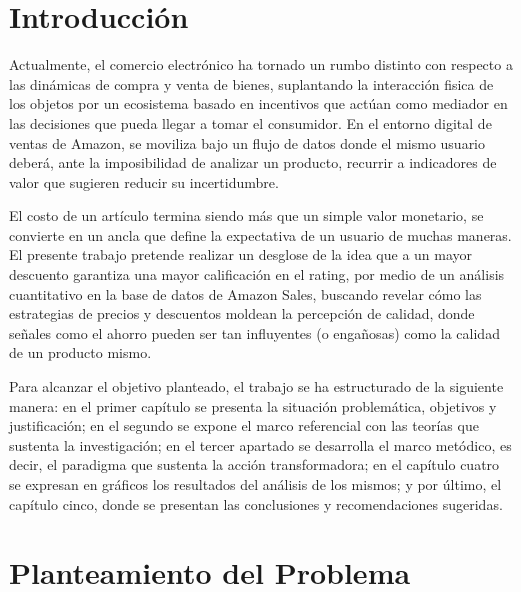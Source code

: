 \documentclass[oneside,11pt]{Latex/Classes/PhDthesisPSnPDF}
\begin{document}
  \cleardoublepage

\mainmatter
\def\baselinestretch{1.5}

\chapter*{Introducción}

Actualmente, el comercio electrónico ha tornado un rumbo distinto con
respecto a las dinámicas de compra y venta de bienes, suplantando la
interacción fisica de los objetos por un ecosistema basado en incentivos
que actúan como mediador en las decisiones que pueda llegar a tomar el
consumidor. En el entorno digital de ventas de Amazon, se moviliza bajo
un flujo de datos donde el mismo usuario deberá, ante la imposibilidad
de analizar un producto, recurrir a indicadores de valor que sugieren
reducir su incertidumbre.

El costo de un artículo termina siendo más que un simple valor
monetario, se convierte en un ancla que define la expectativa de un
usuario de muchas maneras. El presente trabajo pretende realizar un
desglose de la idea que a un mayor descuento garantiza una mayor
calificación en el rating, por medio de un análisis cuantitativo en la
base de datos de Amazon Sales, buscando revelar cómo las estrategias de
precios y descuentos moldean la percepción de calidad, donde señales
como el ahorro pueden ser tan influyentes (o engañosas) como la calidad
de un producto mismo.

Para alcanzar el objetivo planteado, el trabajo se ha estructurado de la
siguiente manera: en el primer capítulo se presenta la situación
problemática, objetivos y justificación; en el segundo se expone el
marco referencial con las teorías que sustenta la investigación; en el
tercer apartado se desarrolla el marco metódico, es decir, el paradigma
que sustenta la acción transformadora; en el capítulo cuatro se expresan
en gráficos los resultados del análisis de los mismos; y por último, el
capítulo cinco, donde se presentan las conclusiones y recomendaciones
sugeridas.

\chapter{Planteamiento del Problema}
\end{document}
